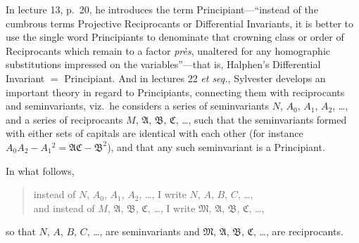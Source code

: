 \documentclass[11pt]{article}
\begin{document}
In lecture 13, p.\ 20, he introduces the term Principiant---``instead of the cumbrous terms Projective Reciprocants or Differential Invariants, it is better to use the single word Principiants to denominate that crowning class or order of Reciprocants which remain to a factor \emph{pr\`es}, unaltered for any homographic substitutions impressed on the variables''---that is, Halphen's Differential Invariant $=$ Principiant. And in lectures 22 \emph{et seq.}, Sylvester develops an important theory in regard to Principiants, connecting them with reciprocants and seminvariants, viz.\ he considers a series of seminvariants $N$, $A_0$, $A_1$, $A_2$, \ldots, and a series of reciprocants $M$, $\mathfrak{A}$, $\mathfrak{B}$, $\mathfrak{C}$, \ldots, such that the seminvariants formed with either sets of capitals are identical with each other (for instance $A_0 A_2 - A_1{}^2 = \mathfrak{A}\mathfrak{C} - \mathfrak{B}^2$), and that any such seminvariant is a Principiant.

In what follows,
\begin{quote}
instead of $N$, $A_0$, $A_1$, $A_2$, \ldots, I write $N$, $A$, $B$, $C$, \ldots, \\
and instead of $M$, $\mathfrak{A}$, $\mathfrak{B}$, $\mathfrak{C}$, \ldots, I write $\mathfrak{M}$, $\mathfrak{A}$, $\mathfrak{B}$, $\mathfrak{C}$, \ldots,
\end{quote}
so that $N$, $A$, $B$, $C$, \ldots, are seminvariants and $\mathfrak{M}$, $\mathfrak{A}$, $\mathfrak{B}$, $\mathfrak{C}$, \ldots, are reciprocants.
\end{document}
